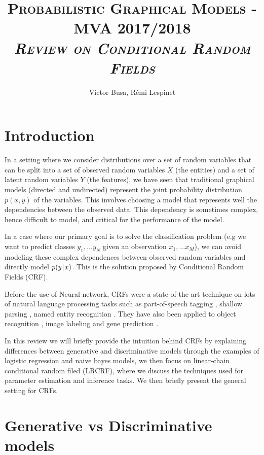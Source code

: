\documentclass[a4paper, 11pt]{article}
\title{\textsc{Probabilistic Graphical Models - MVA 2017/2018 \\ \emph{Review on Conditional Random Fields}} }
\author{Victor Busa, Rémi Lespinet}
\date{}
\newcommand{\pcond}[2]{p(#1 \hspace{-.2em}\mid\hspace{-.2em} #2)}
\begin{document}
\maketitle
\thispagestyle{fancy}

\vspace{-4em}
\section{Introduction}

In a setting where we consider distributions over a set of random
variables that can be split into a set of observed random variables
$X$ (the entities) and a set of latent random variables $Y$ (the
features), we have seen that traditional graphical models (directed
and undirected) represent the joint probability distribution $p(x, y)$
of the variables. This involves choosing a model that represents well
the dependencies between the observed data. This dependency is
sometimes complex, hence difficult to model, and critical for the
performance of the model.

In a case where our primary goal is to solve the classification
problem (e.g we want to predict classes $y_1, \dots y_N$ given an
observation $x_1, \dots x_M$), we can avoid modeling these complex
dependences between observed random variables and directly model
$\pcond{y}{x}$. This is the solution proposed by Conditional Random
Fields (CRF).

Before the use of Neural network, CRFs were a
state-of-the-art technique on lots of natural language processing
tasks such as part-of-speech tagging \autocite{lafferty2001}, shallow
parsing \autocite{sha2003}, named entity recognition
\autocite{mcdonald2005}. They have also been applied to object
recognition \autocite{quattoni2005}, image labeling \autocite{he2004}
and gene prediction \autocite{decaprio2007}.

In this review we will briefly provide the intuition behind CRFs by
explaining differences between generative and discriminative models through
the examples of logistic regression and naive bayes models, we then
focus on linear-chain conditional random filed (LRCRF), where we
discuss the techniques used for parameter estimation and inference
tasks. We then briefly present the general setting for CRFs.

\section{Generative vs Discriminative models}
\end{document}
